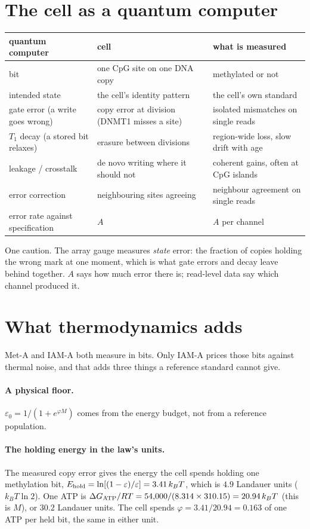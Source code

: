 \section{The cell as a quantum computer}
\begin{center}\small\begin{tabular}{p{}p{}p{}}\toprule
quantum computer & cell & what is measured\\\midrule
bit & one CpG site on one DNA copy & methylated or not\\
intended state & the cell's identity pattern & the cell's own standard\\
gate error (a write goes wrong) & copy error at division (DNMT1 misses a site) & isolated mismatches on single reads\\
$T_1$ decay (a stored bit relaxes) & erasure between divisions & region-wide loss, slow drift with age\\
leakage / crosstalk & de novo writing where it should not & coherent gains, often at CpG islands\\
error correction & neighbouring sites agreeing & neighbour agreement on single reads\\
error rate against specification & $A$ & $A$ per channel\\\bottomrule
\end{tabular}\end{center}
One caution. The array gauge measures \emph{state} error: the fraction of copies holding the wrong mark at one moment, which is what gate errors and
decay leave behind together. $A$ says how much error there is; read-level data say which channel produced it.

\section{What thermodynamics adds}
Met-A and IAM-A both measure in bits. Only IAM-A prices those bits against thermal noise, and that adds three things a reference standard
cannot give.
\paragraph{A physical floor.} $\varepsilon_0=1/(1+e^{\varphi M})$ comes from the energy budget, not from a reference population.
\paragraph{The holding energy in the law's units.} The measured copy error gives the energy the cell spends holding one methylation bit,
$E_{\rm hold}=\ln[(1-\varepsilon)/\varepsilon]=3.41\,k_BT$, which is $4.9$ Landauer units ($k_BT\ln2$). One ATP is $\Delta G_{\rm ATP}/RT=
54{,}000/(8.314\times310.15)=20.94\,k_BT$ (this is $M$), or $30.2$ Landauer units. The cell spends $\varphi=3.41/20.94=0.163$ of one ATP per held
bit, the same in either unit.
